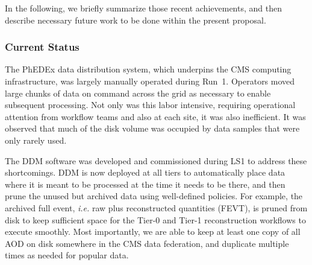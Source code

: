 \documentclass[11pt,a4paper]{article}
\begin{document}
In the following, we briefly summarize those recent achievements, and then
describe necessary future work to be done within the present proposal.

\subsubsection{Current Status}


The PhEDEx data distribution system, which underpins the CMS computing
infrastructure, was largely manually operated during Run~1.    Operators
moved large chunks of data on command across the grid as necessary to
enable subsequent processing.  Not only was this labor intensive, requiring
operational attention from workflow teams and also at each site, it was
also inefficient.  It was observed that much of the disk volume was
occupied by data samples that were only rarely used.


The DDM software was developed and commissioned during LS1 to address these
shortcomings. DDM is now deployed at all tiers to automatically place data
where it is meant to be processed at the time it needs to be there, and
then prune the unused but archived data using well-defined policies.  For
example, the archived full event, {\it i.e.} raw plus reconstructed
quantities (FEVT), is pruned from disk to keep sufficient space for the
Tier-0 and Tier-1 reconstruction workflows to execute smoothly. Most
importantly, we are able to keep at least one copy of all AOD on disk
somewhere in the CMS data federation, and duplicate multiple times as
needed for popular data.
\end{document}

